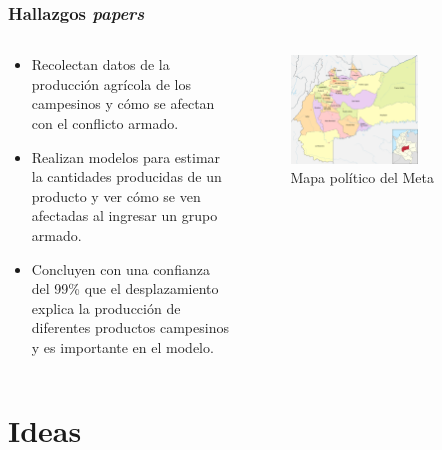 \documentclass[17pt, t, lualatex]{beamer}
\begin{document}
\insertsectionpage

\begin{frame}[allowframebreaks]
  \frametitle{Hallazgos \textit{papers}}
  
  \begin{columns}
    \begin{column}{.5\textwidth}
      \begin{itemize}
        \item Recolectan datos de la producción agrícola de los campesinos y
              cómo se afectan con el conflicto armado.              
        \item Realizan modelos para estimar la cantidades producidas de un
              producto y ver cómo se ven afectadas al ingresar un grupo armado.
        \item Concluyen con una confianza del 99\% que el desplazamiento explica
              la producción de diferentes productos campesinos y es importante
              en el modelo.
      \end{itemize}
    \end{column}

    \begin{column}{.5\textwidth}
      \begin{figure}[ht]
        \centering
        \includegraphics[width=0.7\textwidth]{img/MapaMeta.png}
        \caption{\label{fig:p1f1} Mapa político del Meta \cite{eswiki:166396423}}
      \end{figure}

    \end{column}
  \end{columns}

\end{frame}


\section{Ideas}
\end{document}
